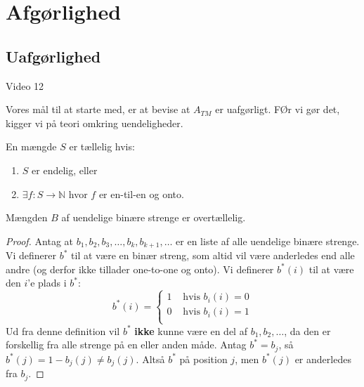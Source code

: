 \chapter{Afgørlighed}

\section{Uafgørlighed}%
\label{sec:label}

\begin{note}[Kilder]
	Video 12
\end{note}

Vores mål til at starte med, er at bevise at $A_{TM}$ er uafgørligt. FØr vi gør det, kigger vi på teori omkring uendeligheder.

\begin{definition}
	En mængde $S$ er tællelig hvis:
	\begin{enumerate}
		\item $S$ er endelig, eller
		\item $\exists f : S \rightarrow \mathbb{N}$ hvor $f$ er en-til-en og onto.
	\end{enumerate}
\end{definition}

\begin{theorem}
	Mængden $B$ af uendelige binære strenge er overtællelig.
\end{theorem}

\begin{proof}
	Antag at $b_{1}, b_{2}, b_{3}, \ldots, b_{k}, b_{k+1}, \ldots$ er en liste af alle uendelige binære strenge.
	Vi definerer $b^{*}$ til at være en binær streng, som altid vil være anderledes end alle andre (og derfor ikke tillader one-to-one og onto). Vi definerer $b^{*}(i)$ til at være den $i$'e plads i $b^{*}$:
	\begin{equation}
		b^{*}(i) = \begin{cases}
			1 & \text{ hvis } b_{i}(i) = 0 \\
			0 & \text{ hvis } b_{i}(i) = 1 \\
		\end{cases}
	\end{equation}
	Ud fra denne definition vil $b^{*}$ \textbf{ikke} kunne være en del af $b_{1}, b_{2}, \ldots$, da den er forskellig fra alle strenge på en eller anden måde. Antag $b^{*} = b_{j}$, så $b^{*}(j) = 1 - b_{j}(j) \ne b_{j}(j)$. Altså $b^{*}$ på position $j$, men $b^{*}(j)$ er anderledes fra $b_{j}$.
\end{proof}

